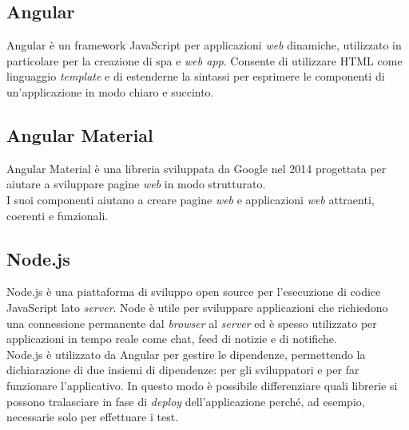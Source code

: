 \subsection*{Angular}
Angular è un \gls{framework} JavaScript per applicazioni \textit{web} dinamiche, utilizzato in particolare per la creazione di \gls{spa} e \textit{web app}. Consente di utilizzare HTML come linguaggio \textit{template} e di estenderne la sintassi per esprimere le componenti di un'applicazione in modo chiaro e succinto.

\subsection*{Angular Material}
Angular Material è una libreria sviluppata da Google nel 2014 progettata per aiutare a sviluppare pagine \textit{web} in modo strutturato. \\
I suoi componenti aiutano a creare pagine \textit{web} e applicazioni \textit{web} attraenti, coerenti e funzionali.

\subsection*{Node.js}
Node.js è una piattaforma di sviluppo open source per l'esecuzione di codice JavaScript lato \textit{server}. Node è utile per sviluppare applicazioni che richiedono una connessione permanente dal \textit{browser} al \textit{server} ed è spesso utilizzato per applicazioni in tempo reale come chat, feed di notizie e di notifiche.\\
Node.js è utilizzato da Angular per gestire le dipendenze, permettendo la dichiarazione di due insiemi di dipendenze: per gli sviluppatori e per far funzionare l'applicativo. In questo modo è possibile differenziare quali librerie si possono tralasciare in fase di \textit{deploy} dell'applicazione perché, ad esempio, necessarie solo per effettuare i test.

